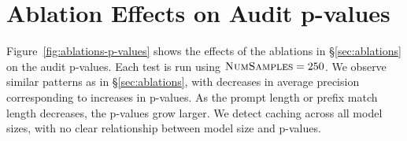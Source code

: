 \section{Ablation Effects on Audit p-values}
\label{app:ablations-p-values}

Figure~\ref{fig:ablations-p-values} shows the effects of the ablations in \S\ref{sec:ablations} on the audit p-values. Each test is run using $\textsc{NumSamples} = 250$. We observe similar patterns as in \S\ref{sec:ablations}, with decreases in average precision corresponding to increases in p-values. As the prompt length or prefix match length decreases, the p-values grow larger. We detect caching across all model sizes, with no clear relationship between model size and p-values.



